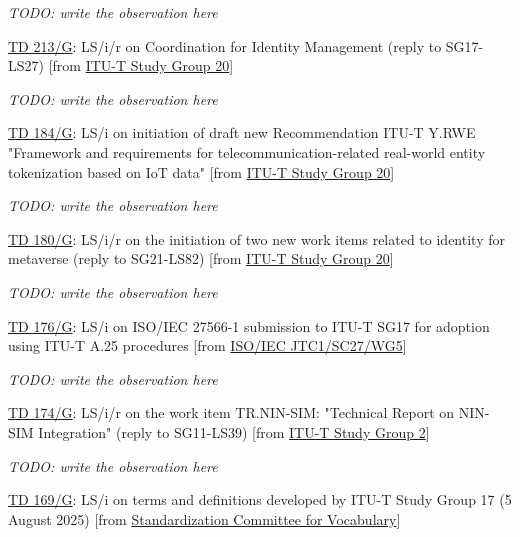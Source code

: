\textit{TODO: write the observation here}

\href{https://www.itu.int/md/meetingdoc.asp?lang=en\&parent=T25-SG17-251203-TD-GEN-0213}{TD 213/G}: LS/i/r on Coordination for Identity Management (reply to SG17-LS27)  [from \href{https://www.itu.int/md/meetingdoc.asp?lang=en\&parent=T25-SG17-251203-TD-GEN\&question=Q10/17\&source=ITU-T\%20Study\%20Group\%2020}{ITU-T Study Group 20}]

\textit{TODO: write the observation here}

\href{https://www.itu.int/md/meetingdoc.asp?lang=en\&parent=T25-SG17-251203-TD-GEN-0184}{TD 184/G}: LS/i on initiation of draft new Recommendation ITU-T Y.RWE "Framework and requirements for telecommunication-related real-world entity tokenization based on IoT data"  [from \href{https://www.itu.int/md/meetingdoc.asp?lang=en\&parent=T25-SG17-251203-TD-GEN\&question=Q10/17\&source=ITU-T\%20Study\%20Group\%2020}{ITU-T Study Group 20}]

\textit{TODO: write the observation here}

\href{https://www.itu.int/md/meetingdoc.asp?lang=en\&parent=T25-SG17-251203-TD-GEN-0180}{TD 180/G}: LS/i/r on the initiation of two new work items related to identity for metaverse (reply to SG21-LS82)  [from \href{https://www.itu.int/md/meetingdoc.asp?lang=en\&parent=T25-SG17-251203-TD-GEN\&question=Q10/17\&source=ITU-T\%20Study\%20Group\%2020}{ITU-T Study Group 20}]

\textit{TODO: write the observation here}

\href{https://www.itu.int/md/meetingdoc.asp?lang=en\&parent=T25-SG17-251203-TD-GEN-0176}{TD 176/G}: LS/i on ISO/IEC 27566-1 submission to ITU-T SG17 for adoption using ITU-T A.25 procedures  [from \href{https://www.itu.int/md/meetingdoc.asp?lang=en\&parent=T25-SG17-251203-TD-GEN\&question=Q10/17\&source=ISO/IEC\%20JTC1/SC27/WG5}{ISO/IEC JTC1/SC27/WG5}]

\textit{TODO: write the observation here}

\href{https://www.itu.int/md/meetingdoc.asp?lang=en\&parent=T25-SG17-251203-TD-GEN-0174}{TD 174/G}: LS/i/r on the work item TR.NIN-SIM: "Technical Report on NIN-SIM Integration" (reply to SG11-LS39)  [from \href{https://www.itu.int/md/meetingdoc.asp?lang=en\&parent=T25-SG17-251203-TD-GEN\&question=Q10/17\&source=ITU-T\%20Study\%20Group\%202}{ITU-T Study Group 2}]

\textit{TODO: write the observation here}

\href{https://www.itu.int/md/meetingdoc.asp?lang=en\&parent=T25-SG17-251203-TD-GEN-0169}{TD 169/G}: LS/i on terms and definitions developed by ITU-T Study Group 17 (5 August 2025)  [from \href{https://www.itu.int/md/meetingdoc.asp?lang=en\&parent=T25-SG17-251203-TD-GEN\&question=Q10/17\&source=Standardization\%20Committee\%20for\%20Vocabulary}{Standardization Committee for Vocabulary}]

